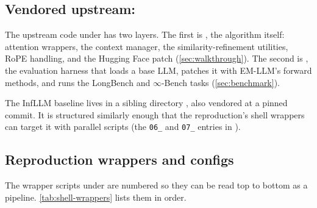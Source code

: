 \subsection{Vendored upstream: }
\label{sec:vendored}

The upstream code under  has two layers. The first is , the algorithm itself: attention wrappers, the context manager, the similarity-refinement utilities, RoPE handling, and the Hugging Face patch (\cref{sec:walkthrough}). The second is , the evaluation harness that loads a base LLM, patches it with EM-LLM's forward methods, and runs the LongBench and $\infty$-Bench tasks (\cref{sec:benchmark}).

The InfLLM baseline lives in a sibling directory , also vendored at a pinned commit. It is structured similarly enough that the reproduction's shell wrappers can target it with parallel scripts (the \texttt{06\_} and \texttt{07\_} entries in ).

\subsection{Reproduction wrappers and configs}
\label{sec:wrappers-configs}

The wrapper scripts under  are numbered so they can be read top to bottom as a pipeline. \cref{tab:shell-wrappers} lists them in order.

